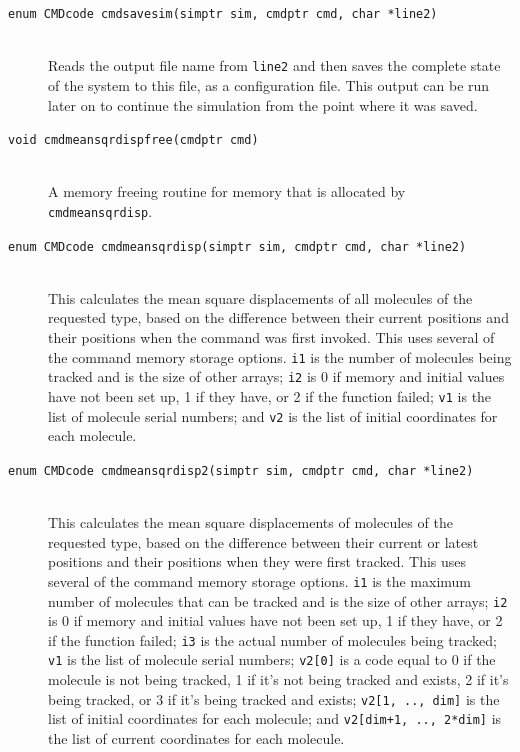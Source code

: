 \documentclass {scrbook}
\newcommand {\ttt} {\texttt}
\begin{document}
\begin{description}
\item[\ttt{enum CMDcode cmdsavesim(simptr sim, cmdptr cmd, char *line2)}]
\hfill \\
Reads the output file name from \ttt{line2} and then saves the complete state of the system to this file, as a configuration file. This output can be run later on to continue the simulation from the point where it was saved.

\item[\ttt{void cmdmeansqrdispfree(cmdptr cmd)}]
\hfill \\
A memory freeing routine for memory that is allocated by \ttt{cmdmeansqrdisp}.

\item[\ttt{enum CMDcode cmdmeansqrdisp(simptr sim, cmdptr cmd, char *line2)}]
\hfill \\
This calculates the mean square displacements of all molecules of the requested type, based on the difference between their current positions and their positions when the command was first invoked. This uses several of the command memory storage options. \ttt{i1} is the number of molecules being tracked and is the size of other arrays; \ttt{i2} is 0 if memory and initial values have not been set up, 1 if they have, or 2 if the function failed; \ttt{v1} is the list of molecule serial numbers; and \ttt{v2} is the list of initial coordinates for each molecule.

\item[\ttt{enum CMDcode cmdmeansqrdisp2(simptr sim, cmdptr cmd, char *line2)}]
\hfill \\
This calculates the mean square displacements of molecules of the requested type, based on the difference between their current or latest positions and their positions when they were first tracked. This uses several of the command memory storage options. \ttt{i1} is the maximum number of molecules that can be tracked and is the size of other arrays; \ttt{i2} is 0 if memory and initial values have not been set up, 1 if they have, or 2 if the function failed; \ttt{i3} is the actual number of molecules being tracked; \ttt{v1} is the list of molecule serial numbers; \ttt{v2[0]} is a code equal to 0 if the molecule is not being tracked, 1 if it's not being tracked and exists, 2 if it's being tracked, or 3 if it's being tracked and exists; \ttt{v2[1, .., dim]} is the list of initial coordinates for each molecule; and \ttt{v2[dim+1, .., 2*dim]} is the list of current coordinates for each molecule.


\end{description}
\end{document}
